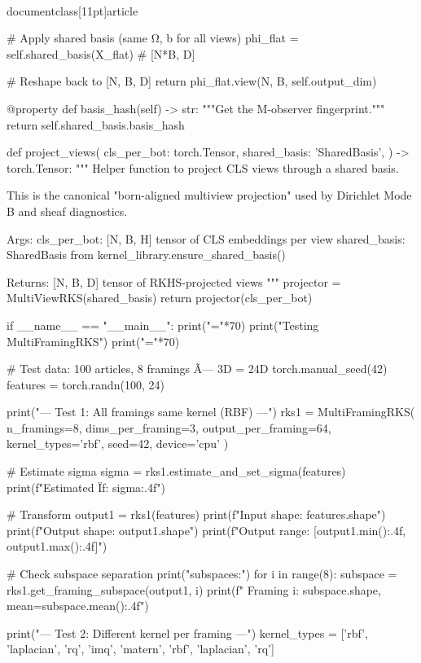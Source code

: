 \\documentclass[11pt]{article}
\begin{document}
\begin{CodeBlock}
        # Apply shared basis (same Ω, b for all views)
        phi_flat = self.shared_basis(X_flat)  # [N*B, D]
        
        # Reshape back to [N, B, D]
        return phi_flat.view(N, B, self.output_dim)
    
    @property
    def basis_hash(self) -> str:
        """Get the M-observer fingerprint."""
        return self.shared_basis.basis_hash


def project_views(
    cls_per_bot: torch.Tensor,
    shared_basis: 'SharedBasis',
) -> torch.Tensor:
    """
    Helper function to project CLS views through a shared basis.
    
    This is the canonical "born-aligned multiview projection" used by
    Dirichlet Mode B and sheaf diagnostics.
    
    Args:
        cls_per_bot: [N, B, H] tensor of CLS embeddings per view
        shared_basis: SharedBasis from kernel_library.ensure_shared_basis()
        
    Returns:
        [N, B, D] tensor of RKHS-projected views
    """
    projector = MultiViewRKS(shared_basis)
    return projector(cls_per_bot)


if __name__ == "__main__":
    print("="*70)
    print("Testing MultiFramingRKS")
    print("="*70)
    
    # Test data: 100 articles, 8 framings Ã— 3D = 24D
    torch.manual_seed(42)
    features = torch.randn(100, 24)
    
    print("\n--- Test 1: All framings same kernel (RBF) ---")
    rks1 = MultiFramingRKS(
        n_framings=8,
        dims_per_framing=3,
        output_per_framing=64,
        kernel_types='rbf',
        seed=42,
        device='cpu'
    )
    
    # Estimate sigma
    sigma = rks1.estimate_and_set_sigma(features)
    print(f"Estimated Ïƒ: {sigma:.4f}")
    
    # Transform
    output1 = rks1(features)
    print(f"Input shape: {features.shape}")
    print(f"Output shape: {output1.shape}")
    print(f"Output range: [{output1.min():.4f}, {output1.max():.4f}]")
    
    # Check subspace separation
    print("\nFraming subspaces:")
    for i in range(8):
        subspace = rks1.get_framing_subspace(output1, i)
        print(f"  Framing {i}: {subspace.shape}, mean={subspace.mean():.4f}")
    
    print("\n--- Test 2: Different kernel per framing ---")
    kernel_types = ['rbf', 'laplacian', 'rq', 'imq', 'matern', 'rbf', 'laplacian', 'rq']
    

\end{CodeBlock}
\end{document}
